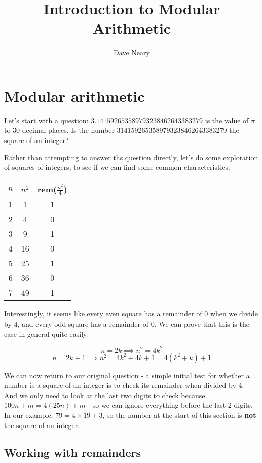 \documentclass{article}
\begin{document}
\author{Dave Neary}
\title{Introduction to Modular Arithmetic}

\maketitle

\section{Modular arithmetic}

Let's start with a question: $3.141592653589793238462643383279$ is the value of 
$\pi$ to 30 decimal places. Is the number 3141592653589793238462643383279 the
square of an integer?

Rather than attempting to answer ths question directly, let's do some exploration
of squares of integers, to see if we can find some common characteristics.

\begin{table}[htb]
\begin{tabular}{|c|c|c|}
\hline
	$n$ & $n^2$ & rem($\frac{n^2}{4}$) \\   
\hline 
	1 &  1 & 1 \\
	2 &  4 & 0 \\
	3 &  9 & 1 \\
	4 & 16 & 0 \\
	5 & 25 & 1 \\
	6 & 36 & 0 \\
	7 & 49 & 1 \\
\hline 
\end{tabular}
\end{table}

Interestingly, it seems like every even square has a remainder of 0 when we divide
by 4, and every odd square has a remainder of 0. We can prove that this is the case
in general quite easily:

\[ n = 2k \implies n^2 = 4k^2 \]
\[ n = 2k+1 \implies n^2 = 4k^2 + 4k + 1 = 4(k^2+k) + 1 \]


We can now return to our original question - a simple initial test for whether a
number is a square of an integer is to check its remainder when divided by 4. And
we only need to look at the last two digits to check because $100n+m =4(25n)+m$ -
so we can ignore everything before the last 2 digits. In our example, 
$79 = 4\times 19 + 3$, so the number at the start of this section is \textbf{not}
the square of an integer.

\subsection{Working with remainders}
\end{document}
